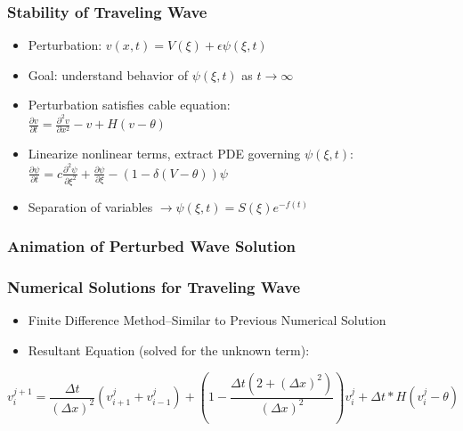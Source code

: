 \documentclass{beamer}
\begin{document}
\begin{frame}
\frametitle{Stability of Traveling Wave}
\begin{itemize}
	\item Perturbation: $v(x,t)=V(\xi)+\epsilon\psi(\xi,t)$
	\item Goal: understand behavior of $\psi(\xi,t)$ as $t\rightarrow\infty$
	\item Perturbation satisfies cable equation:\\ $\frac{\partial v}{\partial t}=\frac{\partial ^2 v}{\partial x^2}-v+H(v-\theta)$
	\item Linearize nonlinear terms, extract PDE governing $\psi(\xi,t)$:\\
	$\frac{\partial \psi}{\partial t} = c \frac{\partial^2\psi}{\partial\xi^2} + \frac{\partial\psi}{\partial\xi} - (1 - \delta(V-\theta))\psi$
	\item Separation of variables $\rightarrow\psi(\xi,t)=S(\xi)e^{-f(t)}$
\end{itemize}
\end{frame}

\begin{frame}
\frametitle{Animation of Perturbed Wave Solution}
\end{frame}

\begin{frame}
\frametitle{Numerical Solutions for Traveling Wave}
\begin{itemize}
	\item{Finite Difference Method--Similar to Previous Numerical Solution}
	\item{Resultant Equation (solved for the unknown term):}
\end{itemize}
\[v^{j+1}_i=\frac{\Delta{t}}{(\Delta{x})^2}(v^{j}_{i+1}+v^{j}_{i-1})+(1-\frac{\Delta{t}(2+(\Delta{x})^2)}{(\Delta{x})^2})v^{j}_{i}+\Delta{t}*H(v^j_i-\theta)\]


\end{frame}
\end{document}
